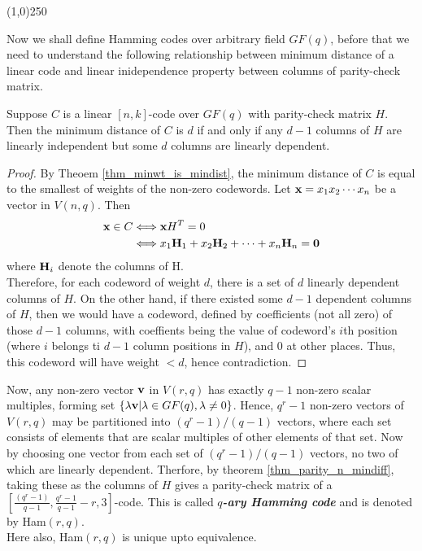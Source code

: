 \documentclass[../main.tex]{subfiles}
\begin{document}
\begin{center}
\line(1,0){250}
\end{center}

Now we shall define Hamming codes over arbitrary field $GF(q)$, before that we need to understand the following relationship between minimum distance of a linear code and linear inidependence property between columns of parity-check matrix.

\begin{thm}\label{thm_parity_n_mindiff}
	Suppose $C$ is a linear $[n,k]$-code over $GF(q)$ with parity-check matrix $H$. Then the minimum distance of $C$ is $d$ if and only if any $d-1$ columns of $H$ are linearly independent but some $d$ columns are linearly dependent.
\end{thm}

\begin{proof}
	By Theoem \ref{thm_minwt_is_mindist}, the minimum distance of $C$ is equal to the smallest of weights of the non-zero codewords. Let $\textbf{x} = x_1x_2\cdots x_n$ be a vector in $V(n,q)$. Then 
	\begin{align*}
		\textbf{x} \in C &\Longleftrightarrow \textbf{x}H^T = 0 \\
		&\Longleftrightarrow x_1\textbf{H}_1 + x_2\textbf{H}_2 + \cdots + x_n\textbf{H}_n = \textbf{0}
	\end{align*}
	where $\textbf{H}_i$ denote the columns of H.\\
	Therefore, for each codeword  of weight $d$, there is a set of $d$ linearly dependent columns of $H$. On the other hand, if there existed some $d-1$ dependent columns of $H$, then we would have a codeword, defined by coefficients (not all zero) of those $d-1$ columns, with coeffients being the value of codeword's $i$th position (where $i$ belongs ti $d-1$ column positions in $H$), and 0 at other places. Thus, this codeword will have weight $< d$, hence contradiction.  
\end{proof}
\vspace{2mm}
Now, any non-zero vector $\textbf{v}$ in $V(r,q)$ has exactly $q-1$ non-zero scalar multiples, forming set $\{\lambda \textbf{v} | \lambda \in GF(q), \lambda \neq 0\}$. Hence, $q^r-1$ non-zero vectors of $V(r,q)$ may be partitioned into $(q^r-1)/(q-1)$ vectors, where each set consists of elements that are scalar multiples of other elements of that set. Now by choosing one vector from each set of $(q^r-1)/(q-1)$ vectors, no two of which are linearly dependent. Therfore, by theorem \ref{thm_parity_n_mindiff}, taking these as the columns of $H$ gives a parity-check matrix of a $\left[\frac{(q^r-1)}{q-1}, \frac{q^r-1}{q-1}-r,3\right]$-code. This is called \textbf{\textit{$q$-ary Hamming code}} and is denoted by Ham$(r,q)$.\\
Here also, Ham$(r,q)$ is unique upto equivalence.\\
\end{document}

